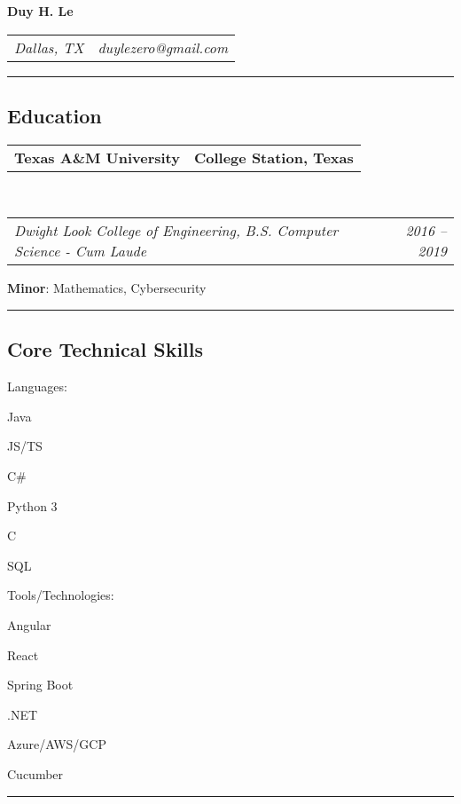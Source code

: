 \documentclass[10pt,letterpaper]{article}
\makeatletter
\newenvironment{indentsection}[1]%
{\begin{list}{}%
	{\setlength{\leftmargin}{#1}}%
	\item[]%
}
{\end{list}}
\newcommand{\headerrow}[2]
{\begin{tabular*}{\linewidth}{l@{\extracolsep{\fill}}r}
	#1 &
	#2 \\
\end{tabular*}}
\newcommand{\CPP}
{C\nolinebreak[4]\hspace{-.05em}\raisebox{.22ex}{\footnotesize\bf ++}}
\makeatother
\begin{document}
\begin{center}
{\LARGE \textbf{Duy H. Le}}
\end{center}
	\headerrow
		{\emph{Dallas, TX}}
		{\emph{duylezero@gmail.com}}
\hrule
\vspace{-0.8em}
\subsection*{Education}

	\headerrow
		{\textbf{Texas A\&M University}}
		{\textbf{College Station, Texas}}
	\\
	\headerrow
		{\emph{Dwight Look College of Engineering, B.S. Computer Science - Cum Laude}}
		{\emph{2016 -- 2019}}
	\vspace{-0.4em}
		 \textbf{Minor}: Mathematics, Cybersecurity \\

\hrule
\vspace{-0.8em}
\subsection*{Core Technical Skills}
\vspace{-0.4em}
\begin{indentsection}{\parindent}
\begin{description*}
	\item[Languages:]
	\begin{inparaitem}[\ * \ ]
		 Java
		\item JS/TS
		\item C\#
		\item Python 3
 		\item \CPP \ 
		\item SQL
	\end{inparaitem}
	\item[Tools/Technologies:]
		\begin{inparaitem}[\ * \ ]
 		 Angular
		\item React 
		\item Spring Boot
		\item .NET
		\item Azure/AWS/GCP
		\item Cucumber
	\end{inparaitem}
\end{description*}
\end{indentsection}

\hrule
\vspace{-0.8em}
\end{document}
